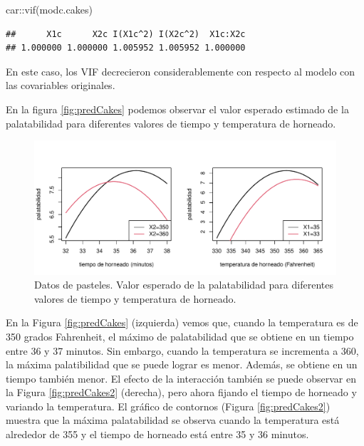 \documentclass[
]{article}
\newenvironment{Shaded}{\begin{snugshade}}{\end{snugshade}}
\newcommand{\FunctionTok}[1]{\textcolor[rgb]{0.00,0.00,0.00}{#1}}
\newcommand{\NormalTok}[1]{#1}
\newcommand{\SpecialCharTok}[1]{\textcolor[rgb]{0.00,0.00,0.00}{#1}}
\begin{document}
\begin{Shaded}
\begin{Highlighting}[]
\NormalTok{car}\SpecialCharTok{::}\FunctionTok{vif}\NormalTok{(modc.cakes)}
\end{Highlighting}
\end{Shaded}

\begin{verbatim}
##      X1c      X2c I(X1c^2) I(X2c^2)  X1c:X2c 
## 1.000000 1.000000 1.005952 1.005952 1.000000
\end{verbatim}

En este caso, los VIF decrecieron considerablemente con respecto al modelo con las covariables originales.

En la figura \ref{fig:predCakes} podemos observar el valor esperado estimado de la palatabilidad para diferentes valores de tiempo y temperatura de horneado.

\begin{figure}

{\centering \includegraphics{MLG2_files/figure-latex/PredCakes-1} 

}

\caption{Datos de pasteles. Valor esperado de la palatabilidad para diferentes valores de tiempo y temperatura de horneado. }\label{fig:PredCakes}
\end{figure}

En la Figura \ref{fig:predCakes} (izquierda) vemos que, cuando la temperatura es de 350 grados Fahrenheit, el máximo de palatabilidad que se obtiene en un tiempo entre 36 y 37 minutos. Sin embargo, cuando la temperatura se incrementa a 360, la máxima palatibilidad que se puede lograr es menor. Además, se obtiene en un tiempo también menor. El efecto de la interacción también se puede observar en la Figura \ref{fig:predCakes2} (derecha), pero ahora fijando el tiempo de horneado y variando la temperatura. El gráfico de contornos (Figura \ref{fig:predCakes2}) muestra que la máxima palatabilidad se observa cuando la temperatura está alrededor de 355 y el tiempo de horneado está entre 35 y 36 minutos.
\end{document}
